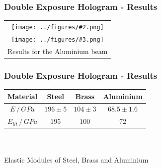 \documentclass{beamer}
\newcommand{\graTwoOneB}[4][]{
	\begin{table}
		\centering
		\begin{tabular}[width=\textwidth]{c}
			\texttt{[image: ../figures/\#2.png]}\\
			\texttt{[image: ../figures/\#3.png]}\\
			#4
		\end{tabular}
	\end{table}
}
\begin{document}
\begin{frame}
	\frametitle{Double Exposure Hologram - Results}
	\graTwoOneB[0.6]{Stab1R1-edit}{Stab3R2-edit}{Results for the Aluminium beam}
\end{frame}
\begin{frame}
	\frametitle{Double Exposure Hologram - Results}
	\begin{table}
		\begin{tabular}{c|ccc}
			Material&Steel&Brass&Aluminium\\\hline
			$E\,/\,\si{GPa}$&$196\pm5$&$104\pm3$&$68.5\pm1.6$\\
			$E_{lit}\,/\,\si{GPa}$\footfullcite{staats}&$195$&$100$&$72$
		\end{tabular}\\\scriptsize\ \\
		{\small Elastic Modules of Steel, Brass and Aluminium}
	\end{table}
\end{frame}
\end{document}
